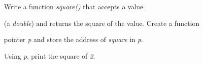 Write a function \textit{square()} that accepts a value

(a \textit{double}) and returns the square of the value. Create a function

pointer \textit{p} and store the address of \textit{square} in \textit{p}.

Using \textit{p}, print the square of \textit{2}.

